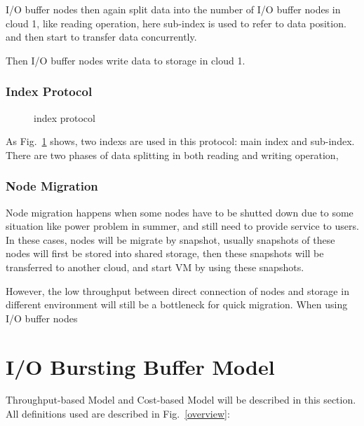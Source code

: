 \documentclass[JIP,draft]{ipsj}
\begin{document}
I/O buffer nodes then again split data into the number of I/O buffer nodes in cloud 1, like reading operation, here sub-index is used to refer to data position. and then start to transfer data concurrently. 

Then I/O buffer nodes write data to storage in cloud 1.

\subsubsection{Index Protocol}

\begin{figure}[tb]
	\centering
	\caption{index protocol}
	\label{index protocol}
\end{figure}

As Fig.~\ref{index protocol} shows, two indexs are used in this protocol: main index and sub-index.
There are two phases of data splitting in both reading and writing operation, 

\subsubsection{Node Migration}
Node migration happens when some nodes have to be shutted down due to some situation like power problem in summer, and still need to provide service to users.
In these cases, nodes will be migrate by snapshot, usually snapshots of these nodes will first be stored into shared storage, then these snapshots will be transferred to another cloud, and start VM by using these snapshots.

However, the low throughput between direct connection of nodes and storage in different environment will still be a bottleneck for quick migration.
When using I/O buffer nodes 

\section{I/O Bursting Buffer Model}


Throughput-based Model and Cost-based Model will be described in this section.
All definitions used are described in Fig.~\ref{overview}:
\end{document}
